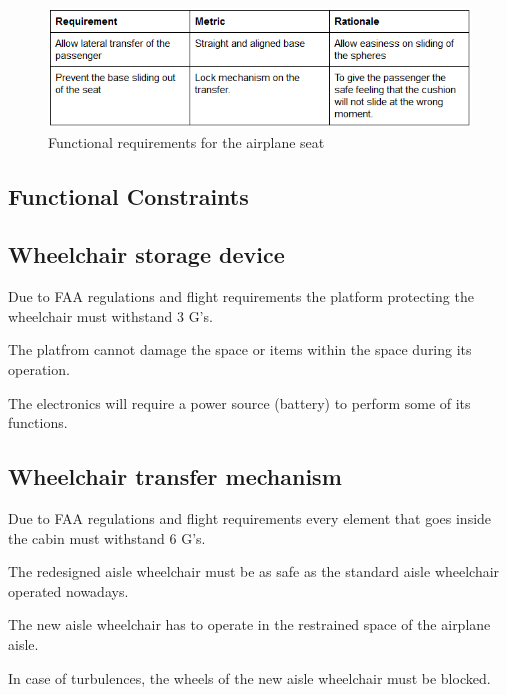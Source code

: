\newpage

\begin{figure}[h!]
  \centering
     \includegraphics[scale=1]{images/functional_requirements_airplane_seat.png}
   \caption{Functional requirements for the airplane seat}
  \label{fig:fun_req_airplane_seat}
\end{figure}

\newpage

\subsection{Functional Constraints}

\subsection*{Wheelchair storage device}

\begin{list}{-}{}
  \item Due to FAA regulations and flight requirements the platform protecting the wheelchair must withstand 3 G's.
  \item The platfrom cannot damage the space or items within the space during its operation.
  \item The electronics will require a power source (battery) to perform some of its functions.
\end{list}

\subsection*{Wheelchair transfer mechanism}

\begin{list}{-}{}
  \item Due to FAA regulations and flight requirements every element that goes inside the cabin must withstand 6 G's.
  \item The redesigned aisle wheelchair must be as safe as the standard aisle wheelchair operated nowadays.
  \item The new aisle wheelchair has to operate in the restrained space of the airplane aisle.
  \item In case of turbulences, the wheels of the new aisle wheelchair must be blocked.
\end{list}

